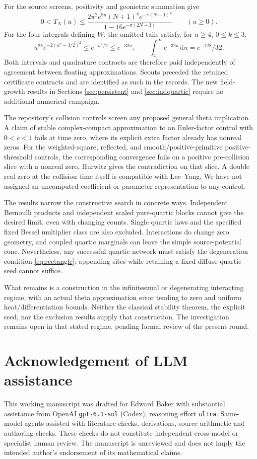 \documentclass[11pt]{article}
\theoremstyle{remark}
\newcommand{\dd}{\,\mathrm d}
\numberwithin{equation}{section}
\begin{document}
For the source screens, positivity and geometric summation give
\[
 0<T_N(u)\le
 \frac{2\pi^2e^{9u}(N+1)^4e^{-\pi(N+1)^2}}
 {1-16e^{-\pi(2N+3)}}\qquad(u\ge0).
\]
For the four integrals defining \(W\), the omitted tails satisfy, for
\(u\ge4\), \(0\le k\le3\),
\[
 u^{2k}e^{-2(u^2-3/2)^2}\le e^{-u^4/2}\le e^{-32u},
 \qquad \int_4^\infty e^{-32u}\dd u=e^{-128}/32.
\]
Both intervals and quadrature contracts are therefore paid independently
of agreement between floating approximations. Scouts preceded the
retained certificate contracts and are identified as such in the records.
The new field-growth results in Sections \ref{sec:persistent} and
\ref{sec:indquartic} require no additional numerical campaign.

The repository's collision controls \cite{controls} screen any proposed
general theta implication. A claim of stable complex-compact approximation
to an Euler-factor control with \(0<c<1\) fails at time zero, where its
explicit extra factor already has nonreal zeros. For the weighted-square,
reflected, and smooth/positive-primitive positive-threshold controls,
the corresponding convergence fails on a positive pre-collision slice
with a nonreal zero. Hurwitz gives the contradiction on that slice.
A double real zero at the collision time itself is compatible with
Lee--Yang. We have not assigned an uncomputed coefficient or parameter
representation to any control.

The results narrow the constructive search in concrete ways. Independent
Bernoulli products and independent scaled pure-quartic blocks cannot give
the desired limit, even with changing counts. Single quartic laws and
the specified fixed Bessel multiplier class are also excluded. Interactions
do change zero geometry, and coupled quartic marginals can leave the
simple source-potential cone. Nevertheless, any successful quartic network
must satisfy the degeneration condition \eqref{eq:rectangle}; appending
sites while retaining a fixed diffuse quartic seed cannot suffice.

What remains is a construction in the infinitesimal or degenerating
interacting regime, with an actual theta approximation error tending to
zero and uniform heat/differentiation bounds. Neither the classical
stability theorem, the explicit seed, nor the exclusion results supply
that construction. The investigation remains open in that stated regime,
pending formal review of the present round.

\section*{Acknowledgement of LLM assistance}
This working manuscript was drafted for Edward Baker with substantial
assistance from OpenAI \texttt{gpt-6.1-sol} (Codex), reasoning effort
\texttt{ultra}. Same-model agents assisted with literature checks,
derivations, source arithmetic and authoring checks. These checks do not
constitute independent cross-model or specialist human review. The
manuscript is unreviewed and does not imply the intended author's
endorsement of its mathematical claims.
\end{document}
